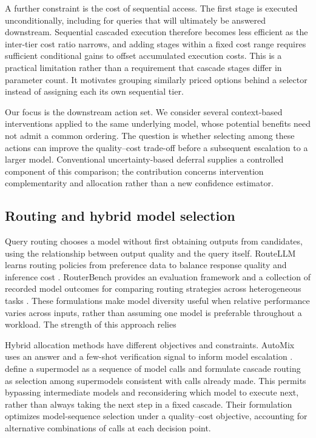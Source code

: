 \documentclass[sigconf]{acmart}
\begin{document}
A further constraint is the cost of sequential access. The first stage is executed unconditionally, including for queries that will ultimately be answered downstream. Sequential cascaded execution therefore becomes less efficient as the inter-tier cost ratio narrows, and adding stages within a fixed cost range requires sufficient conditional gains to offset accumulated execution costs. This is a practical limitation rather than a requirement that cascade stages differ in parameter count. It motivates grouping similarly priced options behind a selector instead of assigning each its own sequential tier.

Our focus is the downstream action set. We consider several context-based interventions applied to the same underlying model, whose potential benefits need not admit a common ordering. The question is whether selecting among these actions can improve the quality--cost trade-off before a subsequent escalation to a larger model. Conventional uncertainty-based deferral supplies a controlled component of this comparison; the contribution concerns intervention complementarity and allocation rather than a new confidence estimator.

\subsection{Routing and hybrid model selection}

Query routing chooses a model without first obtaining outputs from candidates, using the relationship between output quality and the query itself. RouteLLM learns routing policies from preference data to balance response quality and inference cost \cite{ong2024routellmlearningroutellms}. RouterBench provides an evaluation framework and a collection of recorded model outcomes for comparing routing strategies across heterogeneous tasks \cite{routerbench}. These formulations make model diversity useful when relative performance varies across inputs, rather than assuming one model is preferable throughout a workload. The strength of this approach relies 

Hybrid allocation methods have different objectives and constraints. AutoMix uses an answer and a few-shot verification signal to inform model escalation \cite{automix}. \citet{dekoninck2025unified} define a supermodel as a sequence of model calls and formulate cascade routing as selection among supermodels consistent with calls already made. This permits bypassing intermediate models and reconsidering which model to execute next, rather than always taking the next step in a fixed cascade. Their formulation optimizes model-sequence selection under a quality--cost objective, accounting for alternative combinations of calls at each decision point.
\end{document}
